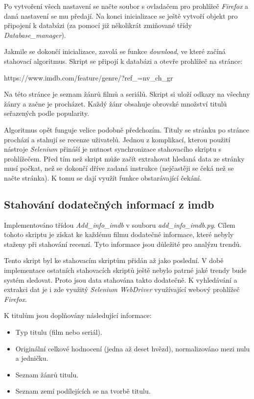Po vytvoření všech nastavení se načte soubor s ovladačem pro prohlížeč \emph{Firefox} a daná nastavení se mu předají.
Na konci inicializace se ještě vytvoří objekt pro připojení k databázi (za pomocí již několikrát zmiňované třídy \emph{Database\_manager}). 

Jakmile se dokončí inicializace, zavolá se funkce \emph{download}, ve které začíná stahovací algoritmus. 
Skript se připojí k databázi a otevře prohlížeč na stránce: 
\begin{center}
    https://www.imdb.com/feature/genre/?ref\_=nv\_ch\_gr    
\end{center}

Na této stránce je seznam žánrů filmů a seriálů. Skript si uloží odkazy na všechny žánry a začne je procházet. Každý žánr obsahuje obrovské množství titulů seřazených podle popularity. 

Algoritmus opět funguje velice podobně předchozím. Tituly se stránku po stránce prochází a stahují se recenze uživatelů. Jednou z komplikací, kterou použití nástroje \emph{Selenium} přináší je nutnost synchronizace stahovacího skriptu s prohlížečem. 
Před tím než skript může začít extrahovat hledaná data ze stránky musí počkat, než se dokončí dříve zadaná instrukce (nejčastěji se čeká než se načte stránka). K tomu se dají využít funkce obstarávající čekání. 


\subsection{Stahování dodatečných informací z imdb}
Implementováno třídou \emph{Add\_info\_imdb} v souboru \emph{add\_info\_imdb.py}. Cílem tohoto skriptu je získat ke každému filmu dodatečné informace, které nebyly staženy při stahování recenzí. Tyto informace jsou důležité pro analýzu trendů. 

Tento skript byl ke stahovacím skriptům přidán až jako poslední. V době implementace ostatních stahovacích skriptů ještě nebylo patrné jaké trendy bude systém sledovat. Proto jsou data stahována takto dodatečně. K vyhledávání a extrakci dat je i zde využitý \emph{Selenium WebDriver} využívající webový prohlížeč \emph{Firefox}.  

K titulům jsou doplňovány následující informace:
\begin{itemize}
    \item Typ titulu (film nebo seriál).
    \item Originální celkové hodnocení (jedna až deset hvězd), normalizováno mezi nulu a jedničku.
    \item Seznam žánrů titulu.
    \item Seznam zemí podílejících se na tvorbě titulu.
\end{itemize}

